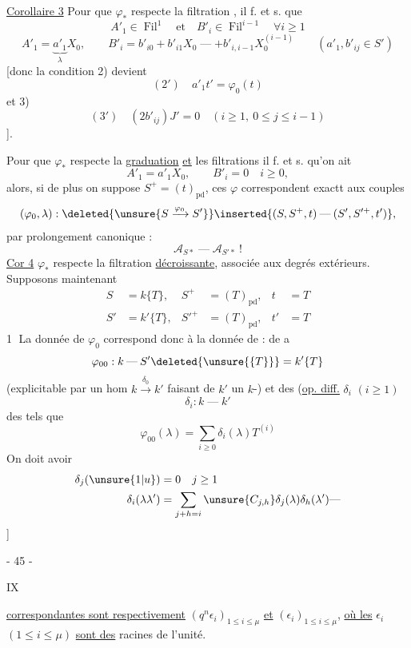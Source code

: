 \uline{Corollaire 3} Pour que $\varphi_*$ respecte la filtration , il f. et s. que
\[
 A'_1\in\operatorname{Fil}^{1}\quad\text{et}\quad B'_i\in\operatorname{Fil}^{i-1}\quad\forall i\geq1
\]
\[
 A'_1=\underbrace{a'_1}_{\lambda}X_0,\qquad
 B'_i=b'_{i0}+b'_{i1}X_0\mathbin{\text{---}}+b'_{i,i-1}X_0^{(i-1)}
 \qquad(a'_1,b'_{ij}\in S')
\]
[donc la condition 2) devient
\[
 (2')\quad a'_1t'=\varphi_0(t)
\]
et 3)
\[
 (3')\quad(2b'_{ij})J'=0\quad(i\geq1,\ 0\leq j\leq i-1)
\]
].

Pour que $\varphi_*$ respecte la \uline{graduation} \uline{et} les filtrations il f. et s. qu'on ait
\[
 A'_1=a'_1X_0,\qquad B'_i=0\quad i\geq0,
\]
alors, si de plus on suppose $S^+=(t)_{\mathrm{pd}}$, ces $\varphi$ correspondent exactt aux couples
\[
 (\varphi_0,\lambda):\deleted{\unsure{S\xrightarrow{\varphi_0}S'}}\inserted{(S,S^+,t)\mathbin{\text{---}}(S',S'^+,t')},
\]
par prolongement canonique :
\[
 \mathcal A_{S*}\mathbin{\text{---}}\mathcal A_{S'*}\ !
\]
\uline{Cor 4} $\varphi_*$ respecte  la filtration \uline{décroissante}, associée aux degrés extérieurs.
Supposons maintenant
\[
 \begin{aligned}
 S&=k\{T\},&S^+&=(T)_{\mathrm{pd}},&t&=T\\
 S'&=k'\{T\},&S'^+&=(T)_{\mathrm{pd}},&t'&=T
 \end{aligned}
\]
\textcircled{1} La donnée de $\varphi_0$ correspond donc à la donnée de :
de \textcircled{a}
\[
 \varphi_{00}:k\mathbin{\text{---}}S'\deleted{\unsure{\{T\}}}=k'\{T\}
\]
(explicitable par un hom $k\xrightarrow{\delta_0}k'$ faisant de $k'$ un $k$-) et des (\uline{op. diff.} $\delta_i$ $(i\geq1)$
\[
 \delta_i:k\mathbin{\text{---}}k'
\]
des tels que
\[
 \varphi_{00}(\lambda)=\sum_{i\geq0}\delta_i(\lambda)T^{(i)}
\]
On doit avoir
\[
 \begin{aligned}
 \delta_j(\unsure{1|u})&=0\quad j\geq1\\
 \delta_i(\lambda\lambda')&=\sum_{j+h=i}\unsure{C_{j,h}}\delta_j(\lambda)\delta_h(\lambda')\mathbin{\text{---}}
 \end{aligned}
\]
]
\begin{center}- 45 -\end{center}\hfill IX

\uline{correspondantes sont respectivement} $(q^n\epsilon_i)_{1\leq i\leq\mu}$ \uline{et} $(\epsilon_i)_{1\leq i\leq\mu}$, \uline{où les} $\epsilon_i$ $(1\leq i\leq\mu)$ \uline{sont des} racines de l'unité.

